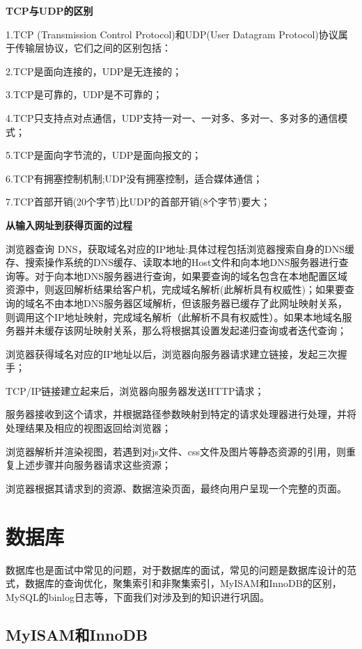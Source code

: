 \documentclass[UTF8]{ctexart}
\begin{document}
\textbf{TCP与UDP的区别}

1.TCP (Transmission Control Protocol)和UDP(User Datagram Protocol)协议属于传输层协议，它们之间的区别包括：

2.TCP是面向连接的，UDP是无连接的；

3.TCP是可靠的，UDP是不可靠的；

4.TCP只支持点对点通信，UDP支持一对一、一对多、多对一、多对多的通信模式；

5.TCP是面向字节流的，UDP是面向报文的；

6.TCP有拥塞控制机制;UDP没有拥塞控制，适合媒体通信；

7.TCP首部开销(20个字节)比UDP的首部开销(8个字节)要大；

\textbf{从输入网址到获得页面的过程}

浏览器查询 DNS，获取域名对应的IP地址:具体过程包括浏览器搜索自身的DNS缓存、搜索操作系统的DNS缓存、读取本地的Host文件和向本地DNS服务器进行查询等。对于向本地DNS服务器进行查询，如果要查询的域名包含在本地配置区域资源中，则返回解析结果给客户机，完成域名解析(此解析具有权威性)；如果要查询的域名不由本地DNS服务器区域解析，但该服务器已缓存了此网址映射关系，则调用这个IP地址映射，完成域名解析（此解析不具有权威性）。如果本地域名服务器并未缓存该网址映射关系，那么将根据其设置发起递归查询或者迭代查询；

浏览器获得域名对应的IP地址以后，浏览器向服务器请求建立链接，发起三次握手；

TCP/IP链接建立起来后，浏览器向服务器发送HTTP请求；

服务器接收到这个请求，并根据路径参数映射到特定的请求处理器进行处理，并将处理结果及相应的视图返回给浏览器；

浏览器解析并渲染视图，若遇到对js文件、css文件及图片等静态资源的引用，则重复上述步骤并向服务器请求这些资源；

浏览器根据其请求到的资源、数据渲染页面，最终向用户呈现一个完整的页面。




\section{数据库}

数据库也是面试中常见的问题，对于数据库的面试，常见的问题是数据库设计的范式，数据库的查询优化，聚集索引和非聚集索引，MyISAM和InnoDB的区别，MySQL的binlog日志等，下面我们对涉及到的知识进行巩固。

\subsection{MyISAM和InnoDB}
\end{document}

